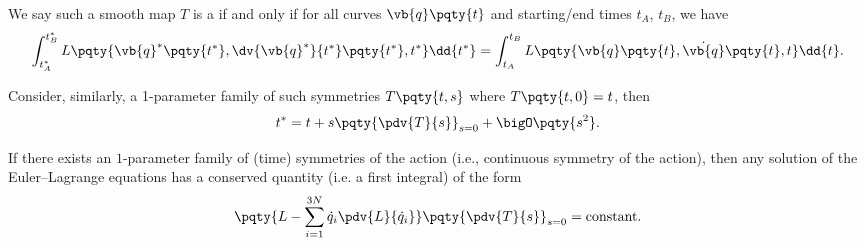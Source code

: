 \begin{definition}
    We say such a smooth map \(T\) is a  if and only if for all curves \(\vb{q} \pqty{t}\) and starting/end times \(t_A\), \(t_B\), we have
    \begin{equation}
        \label{eq:symmetry-of-action-time}%
        \int_{t_A^{\ast}}^{t_B^{\ast}} L\pqty{\vb{q}^{\ast} \pqty{t^{\ast}}, \dv{\vb{q}^{\ast}}{t^\ast} \pqty{t^{\ast}}, t^{\ast}} \dd{t^{\ast}} = \int_{t_A}^{t_B} L \pqty{\vb{q} \pqty{t}, \dot{\vb{q}} \pqty{t}, t} \dd{t}.
    \end{equation}
\end{definition}

Consider, similarly, a 1-parameter family of such symmetries \(T\pqty{t, s}\) where \(T\pqty{t, 0} = t\), then
\[
    t^{\ast} = t + s \pqty{\pdv{T}{s}}_{s = 0} + \bigO\pqty{s^2}.
\]

\begin{theorem}
    \label{thm:noether-thm-ver-2}%
    If there exists an \(1\)-parameter family of (time) symmetries of the action (i.e., continuous symmetry of the action), then any solution of the Euler--Lagrange equations has a conserved quantity (i.e. a first integral) of the form
    \[
        \pqty{L - \sum_{i = 1}^{3N} \dot{q}_i \pdv{L}{\dot{q}_i}} \pqty{\pdv{T}{s}}_{s = 0} = \text{constant}.
    \]
\end{theorem}

